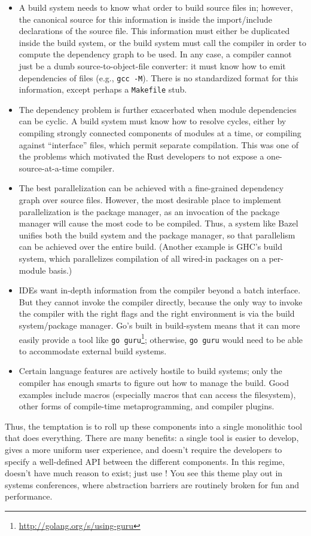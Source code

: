 \begin{itemize}
\item
A build system needs to know what order to build source files in; however, the canonical source for this information is inside the import/include declarations of the source file. This information must either be duplicated inside the build system, or the build system must call the compiler in order to compute the dependency graph to be used. In any case, a compiler cannot just be a dumb source-to-object-file converter: it must know how to emit dependencies of files (e.g., \verb|gcc -M|). There is no standardized format for this information, except perhaps a \verb|Makefile| stub.
\item
The dependency problem is further exacerbated when module dependencies can be cyclic. A build system must know how to resolve cycles, either by compiling strongly connected components of modules at a time, or compiling against ``interface'' files, which permit separate compilation. This was one of the problems which motivated the Rust developers to not expose a one-source-at-a-time compiler.
\item
The best parallelization can be achieved with a fine-grained dependency graph over source files. However, the most desirable place to implement parallelization is the package manager, as an invocation of the package manager will cause the most code to be compiled. Thus, a system like Bazel unifies both the build system and the package manager, so that parallelism can be achieved over the entire build. (Another example is GHC's build system, which parallelizes compilation of all wired-in packages on a per-module basis.)
\item
IDEs want in-depth information from the compiler beyond a batch interface. But they cannot invoke the compiler directly, because the only way to invoke the compiler with the right flags and the right environment is via the build system/package manager. Go's built in build-system means that it can more easily provide a tool like \verb|go guru|\footnote{\url{http://golang.org/s/using-guru}}; otherwise, \verb|go guru| would need to be able to accommodate external build systems.
\item
Certain language features are actively hostile to build systems; only the compiler has enough smarts to figure out how to manage the build. Good examples include macros (especially macros that can access the filesystem), other forms of compile-time metaprogramming, and compiler plugins.
\end{itemize}
%
Thus, the temptation is to roll up these components into a single
monolithic tool that does everything. There are many benefits: a single
tool is easier to develop, gives a more uniform user experience, and
doesn't require the developers to specify a well-defined API between the
different components.  In this regime, \Backpack{} doesn't have much reason
to exist; just use \OldBackpack{}!  You see this theme play out in systems
conferences, where abstraction barriers are routinely broken for fun
and performance.

